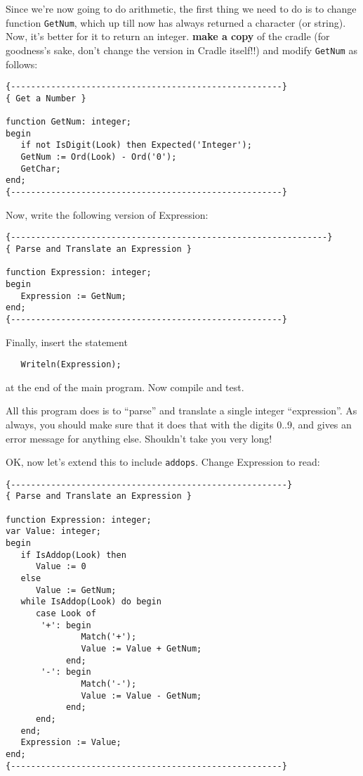 Since we're now going  to  do arithmetic, the first thing we need to do is to change function {\tt GetNum}, which up till now  has always returned a character  (or  string). Now, it's better for it to return an integer. {\bfseries make a copy} of the cradle (for goodness's sake, don't change the version  in  Cradle  itself!!)  and modify {\tt GetNum} as follows:

\begin{verbatim}
{------------------------------------------------------}
{ Get a Number }

function GetNum: integer;
begin
   if not IsDigit(Look) then Expected('Integer');
   GetNum := Ord(Look) - Ord('0');
   GetChar;
end;
{------------------------------------------------------}
\end{verbatim}

Now, write the following version of Expression:

\begin{verbatim}
{---------------------------------------------------------------}
{ Parse and Translate an Expression }

function Expression: integer;
begin
   Expression := GetNum;
end;
{------------------------------------------------------}
\end{verbatim}

Finally, insert the statement

\begin{verbatim}
   Writeln(Expression);
\end{verbatim}

at the end of the main program. Now compile and test.

All this program  does  is  to  ``parse''  and  translate  a single integer  ``expression''.    As always, you should make sure that it does that with the digits 0..9, and gives an  error  message  for anything else. Shouldn't take you very long!

OK, now let's extend this to include {\tt addops}. Change Expression to read:

\begin{verbatim}
{-------------------------------------------------------}
{ Parse and Translate an Expression }

function Expression: integer;
var Value: integer;
begin
   if IsAddop(Look) then
      Value := 0
   else
      Value := GetNum;
   while IsAddop(Look) do begin
      case Look of
       '+': begin
               Match('+');
               Value := Value + GetNum;
            end;
       '-': begin
               Match('-');
               Value := Value - GetNum;
            end;
      end;
   end;
   Expression := Value;
end;
{------------------------------------------------------}
\end{verbatim}

